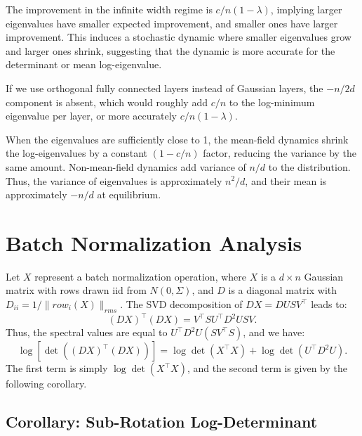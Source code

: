 \begin{remark}
The improvement in the infinite width regime is \( c/n (1-\lambda) \), implying larger eigenvalues have smaller expected improvement, and smaller ones have larger improvement. This induces a stochastic dynamic where smaller eigenvalues grow and larger ones shrink, suggesting that the dynamic is more accurate for the determinant or mean log-eigenvalue.

If we use orthogonal fully connected layers instead of Gaussian layers, the \( -n/2d \) component is absent, which would roughly add \( c/n \) to the log-minimum eigenvalue per layer, or more accurately \( c/n (1-\lambda) \).

When the eigenvalues are sufficiently close to 1, the mean-field dynamics shrink the log-eigenvalues by a constant \( (1-c/n) \) factor, reducing the variance by the same amount. Non-mean-field dynamics add variance of \( n/d \) to the distribution. Thus, the variance of eigenvalues is approximately \( n^2/d \), and their mean is approximately \( -n/d \) at equilibrium.
\end{remark}

\section{Batch Normalization Analysis}

\begin{remark}
Let \( X \) represent a batch normalization operation, where \( X \) is a \( d \times n \) Gaussian matrix with rows drawn iid from \( N(0,\Sigma) \), and \( D \) is a diagonal matrix with \( D_{ii}=1/\|row_i(X)\|_{rms} \). The SVD decomposition of \( DX = D U S V^\top \) leads to:
\begin{equation}
(DX)^\top (DX)  = V^\top S U^\top D^2 U S V.
\end{equation}
Thus, the spectral values are equal to \( U^\top D^2 U (S V^\top S) \), and we have:
\begin{equation}
\log \left[\det\left((DX)^\top (DX)\right)\right] = \log \det(X^\top X) + \log \det\left(U^\top D^2 U\right).
\end{equation}
The first term is simply \( \log \det(X^\top X) \), and the second term is given by the following corollary.
\end{remark}

\subsection{Corollary: Sub-Rotation Log-Determinant}

